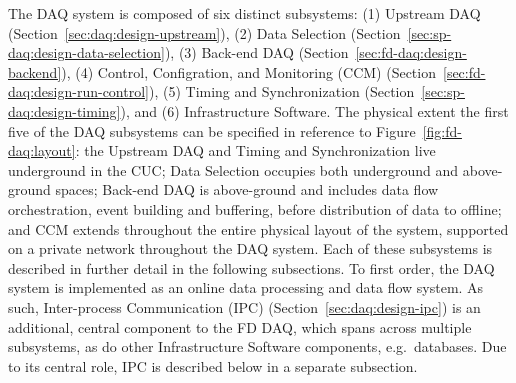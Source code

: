 The  DAQ system is composed of six distinct subsystems: (1) Upstream
DAQ (Section~\ref{sec:daq:design-upstream}), (2) Data Selection
(Section~\ref{sec:sp-daq:design-data-selection}), (3) Back-end DAQ (Section~\ref{sec:fd-daq:design-backend}), (4) Control,
Configration, and Monitoring (CCM) (Section~\ref{sec:fd-daq:design-run-control}), (5) Timing and
Synchronization (Section~\ref{sec:sp-daq:design-timing}), and (6) Infrastructure Software. The physical extent
the first five of the DAQ subsystems
can be specified in reference to Figure~\ref{fig:fd-daq:layout}: the
Upstream DAQ and Timing and Synchronization live underground in the CUC; Data Selection occupies
both underground and above-ground spaces; Back-end DAQ is above-ground
and includes data flow orchestration, event building and buffering, before distribution of data
to offline; and CCM extends throughout the entire physical layout of the
system, supported on a private network throughout the DAQ system. Each of these subsystems is described in further
detail in the following subsections. To first order, the DAQ system
is implemented as an online data processing and data flow system. As
such, Inter-process Communication (IPC) (Section~\ref{sec:daq:design-ipc}) is an
additional, central component to the FD DAQ, which spans across multiple
subsystems, as do other Infrastructure Software components, e.g.~databases. Due
to its central role, IPC is described below in a separate subsection.

